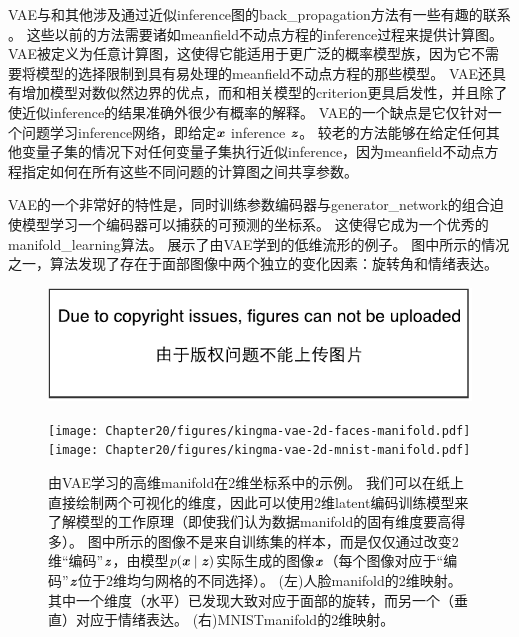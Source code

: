 \gls{VAE}与和其他涉及通过近似\gls{inference}图的\gls{back_propagation}方法有一些有趣的联系 \citep{Goodfellow-et-al-NIPS2013,Stoyanov2011,brakel13a}。
这些以前的方法需要诸如\gls{meanfield}不动点方程的\gls{inference}过程来提供计算图。
\gls{VAE}被定义为任意计算图，这使得它能适用于更广泛的概率模型族，因为它不需要将模型的选择限制到具有易处理的\gls{meanfield}不动点方程的那些模型。
\gls{VAE}还具有增加模型对数似然边界的优点，而和相关模型的\gls{criterion}更具启发性，并且除了使近似\gls{inference}的结果准确外很少有概率的解释。
\gls{VAE}的一个缺点是它仅针对一个问题学习\gls{inference}网络，即给定$\boldsymbol{\mathit{x}}$ \gls{inference} $\boldsymbol{\mathit{z}}$。
较老的方法能够在给定任何其他变量子集的情况下对任何变量子集执行近似\gls{inference}，因为\gls{meanfield}不动点方程指定如何在所有这些不同问题的计算图之间共享参数。


\gls{VAE}的一个非常好的特性是，同时训练参数编码器与\gls{generator_network}的组合迫使模型学习一个编码器可以捕获的可预测的坐标系。
这使得它成为一个优秀的\gls{manifold_learning}算法。
展示了由\gls{VAE}学到的低维流形的例子。
图中所示的情况之一，算法发现了存在于面部图像中两个独立的变化因素：旋转角和情绪表达。


\begin{figure}[!htb]
\ifOpenSource
\centerline{\includegraphics{figure.pdf}}
\else
\centerline{
\texttt{[image: Chapter20/figures/kingma-vae-2d-faces-manifold.pdf]}
\texttt{[image: Chapter20/figures/kingma-vae-2d-mnist-manifold.pdf]}
}
\fi
\caption{由\gls{VAE}学习的高维\gls{manifold}在2维坐标系中的示例\citep{Kingma+Welling-ICLR2014}。
我们可以在纸上直接绘制两个可视化的维度，因此可以使用2维\gls{latent}编码训练模型来了解模型的工作原理（即使我们认为数据\gls{manifold}的固有维度要高得多）。
图中所示的图像不是来自训练集的样本，而是仅仅通过改变2维``编码''$\boldsymbol{\mathit{z}}$，由模型$p(\boldsymbol{\mathit{x}} \mid \boldsymbol{\mathit{z}})$实际生成的图像$\boldsymbol{\mathit{x}}$（每个图像对应于``编码''$\boldsymbol{\mathit{z}}$位于2维均匀网格的不同选择）。
(左)人脸\gls{manifold}的2维映射。 其中一个维度（水平）已发现大致对应于面部的旋转，而另一个（垂直）对应于情绪表达。
(右)MNIST\gls{manifold}的2维映射。
}
\label{fig:chap20_kingma-vae-2d-faces-manifold}
\end{figure}

